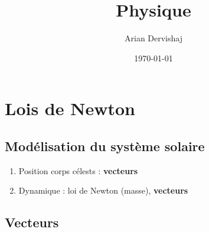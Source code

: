\documentclass[12pt]{article}
\title{Physique}
\author{Arian Dervishaj}
\date{\today}
\begin{document}
\setlength{\parindent}{0pt}
\maketitle
\pagebreak

\section*{Lois de Newton}

\subsection*{Modélisation du système solaire}

\begin{enumerate}
    \item Position corps célests : \textbf{vecteurs}
    \item Dynamique : loi de Newton (masse), \textbf{vecteurs}
\end{enumerate}

\subsection*{Vecteurs}
\end{document}

